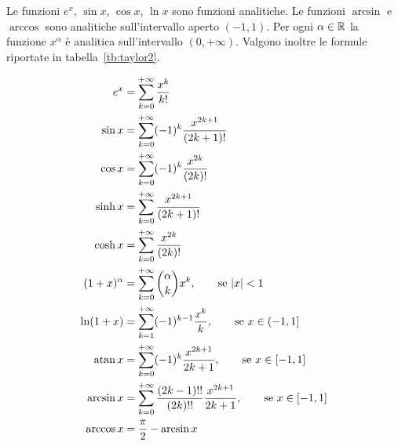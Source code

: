 \begin{theorem}
  \label{th:serie_taylor}
  Le funzioni $e^x$, $\sin x$, $\cos x$, $\ln x$ sono funzioni
  analitiche. Le funzioni $\arcsin$ e $\arccos$ sono analitiche sull'intervallo
  aperto $(-1,1)$. Per ogni $\alpha \in {\mathbb R}$
  la funzione $x^\alpha$ è analitica sull'intervallo $(0,+\infty)$.
  Valgono inoltre le formule riportate in tabella~\ref{tb:taylor2}.
\end{theorem}
%
\begin{table}
\begin{align*}
e^x &= \sum_{k=0}^{+\infty} \frac{x^k}{k!}\\
\sin x &= \sum_{k=0}^{+\infty} (-1)^k\frac{x^{2k+1}}{(2k+1)!}\\
\cos x &= \sum_{k=0}^{+\infty} (-1)^k\frac{x^{2k}}{(2k)!}\\
\sinh x &= \sum_{k=0}^{+\infty} \frac{x^{2k+1}}{(2k+1)!}\\
\cosh x &= \sum_{k=0}^{+\infty} \frac{x^{2k}}{(2k)!} \\
(1+x)^\alpha &= \sum_{k=0}^{+\infty} {\alpha \choose k} x^k, \qquad \text{se ${\left|x\right|}<1$} \\
\ln (1+x) &= \sum_{k=1}^{+\infty} (-1)^{k-1} \frac{x^k}{k}, \qquad \text{se $x\in(-1,1]$} \\
\operatorname{atan} x &= \sum_{k=0}^{+\infty} (-1)^k \frac{x^{2k+1}}{2k+1}, \qquad \text{se $x\in [-1,1]$} \\
\arcsin x &= \sum_{k=0}^{+\infty} \frac{(2k-1)!!}{(2k)!!} \frac{x^{2k+1}}{2k+1}, 
  \qquad \text{se $x\in[-1,1]$} \\
\arccos x &= \frac \pi 2 - \arcsin x
\end{align*}
\caption{sviluppi in serie di Taylor, di alcune funzioni elementari.
%
%
Si veda il teorema~\ref{th:serie_taylor}.}
\label{tb:taylor2}%
\end{table}
%
